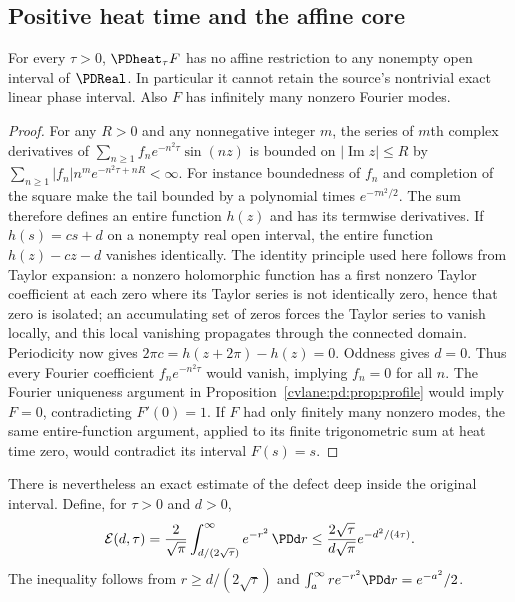 \subsection{Positive heat time and the affine core}

\begin{cvlanepdproposition}\label{cvlane:pd:prop:analytic}
For every $\tau>0$, $\PDheat_\tau F$ has no affine restriction to any nonempty
open interval of $\PDReal$. In particular it cannot retain the source's
nontrivial exact linear phase interval. Also $F$ has infinitely many
nonzero Fourier modes.
\end{cvlanepdproposition}
\begin{proof}
For any $R>0$ and any nonnegative integer $m$, the series of $m$th complex
derivatives of
$\sum_{n\geq1}f_ne^{-n^2\tau}\sin(nz)$ is bounded on
$|\operatorname{Im}z|\leq R$ by
$\sum_{n\geq1}|f_n|n^me^{-n^2\tau+nR}<\infty$.
For instance boundedness of $f_n$ and completion of the square make the
tail bounded by a polynomial times $e^{-\tau n^2/2}$.
The sum therefore defines an entire function $h(z)$ and has its
termwise derivatives. If $h(s)=cs+d$ on a nonempty real open interval,
the entire function $h(z)-cz-d$ vanishes identically. The identity
principle used here follows from Taylor expansion: a nonzero holomorphic
function has a first nonzero Taylor coefficient at each zero where its
Taylor series is not identically zero, hence that zero is isolated;
an accumulating set of zeros forces the Taylor series to vanish locally,
and this local vanishing propagates through the connected domain.
Periodicity now gives $2\pi c=h(z+2\pi)-h(z)=0$. Oddness gives $d=0$.
Thus every Fourier coefficient $f_ne^{-n^2\tau}$ would vanish, implying
$f_n=0$ for all $n$. The Fourier uniqueness argument in
Proposition~\ref{cvlane:pd:prop:profile} would imply $F=0$, contradicting $F'(0)=1$.
If $F$ had only finitely many nonzero modes, the same entire-function
argument, applied to its finite trigonometric sum at heat time zero,
would contradict its interval $F(s)=s$.
\end{proof}

There is nevertheless an exact estimate of the defect deep inside the
original interval. Define, for $\tau>0$ and $d>0$,
\begin{equation}\label{cvlane:pd:eq:tail}
 \mathcal E(d,\tau)=\frac{2}{\sqrt\pi}
          \int_{d/(2\sqrt\tau)}^\infty e^{-r^2}\,\PDd r
 \leq\frac{2\sqrt\tau}{d\sqrt\pi}e^{-d^2/(4\tau)}.
\end{equation}
The inequality follows from $r\geq d/(2\sqrt\tau)$ and
$\int_a^\infty r e^{-r^2}\PDd r=e^{-a^2}/2$.

